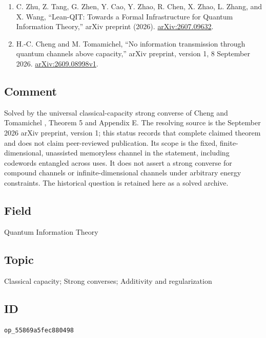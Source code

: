 \begin{enumerate}[label={},leftmargin=4.8em,labelsep=0.5em]
  \item[\textup{[ZTZ+26]}]\label{ref:5586-lean-qit}
  C. Zhu, Z. Tang, G. Zhen, Y. Cao, Y. Zhao, R. Chen, X. Zhao, L. Zhang,
  and X. Wang, ``Lean-QIT: Towards a Formal Infrastructure for Quantum
  Information Theory,'' arXiv preprint (2026).
  \href{https://arxiv.org/abs/2607.09632}{arXiv:2607.09632}.

  \item[\textup{[CT26]}]\label{ref:5586-cheng-tomamichel}
  H.-C. Cheng and M. Tomamichel, ``No information transmission through quantum channels above capacity,'' arXiv preprint, version 1, 8 September 2026. \href{https://arxiv.org/abs/2609.08998v1}{arXiv:2609.08998v1}.
\end{enumerate}

\subsection*{Comment}

Solved by the universal classical-capacity strong converse of Cheng and
Tomamichel , Theorem 5 and
Appendix E.  The resolving source is the September 2026 arXiv preprint,
version 1; this status records that complete claimed theorem and does not
claim peer-reviewed publication.  Its scope is the fixed, finite-dimensional,
unassisted memoryless channel in the statement, including codewords
entangled across uses.  It does not assert a strong converse for compound
channels or infinite-dimensional channels under arbitrary energy constraints.
The historical question is retained here as a solved archive.

\subsection*{Field}

Quantum Information Theory

\subsection*{Topic}

Classical capacity; Strong converses; Additivity and regularization

\subsection*{ID}

\texttt{op\_55869a5fec880498}
